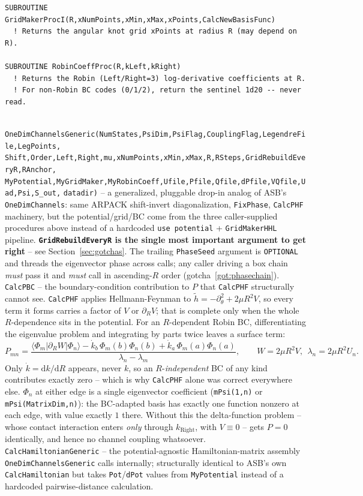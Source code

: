 \documentclass[11pt]{article}
\newcommand{\file}[1]{\texttt{#1}}
\newcommand{\sub}[1]{\texttt{#1}}
\begin{document}
\begin{description}
\begin{lstlisting}
SUBROUTINE GridMakerProcI(R,xNumPoints,xMin,xMax,xPoints,CalcNewBasisFunc)
  ! Returns the angular knot grid xPoints at radius R (may depend on R).

SUBROUTINE RobinCoeffProc(R,kLeft,kRight)
  ! Returns the Robin (Left/Right=3) log-derivative coefficients at R.
  ! For non-Robin BC codes (0/1/2), return the sentinel 1d20 -- never read.
\end{lstlisting}
\item[\file{AdiabaticSolverGeneric.f90}] \hfill \\
  \sub{OneDimChannelsGeneric(NumStates,PsiDim,PsiFlag,CouplingFlag,LegendreFile,LegPoints,}
  \sub{Shift,Order,Left,Right,mu,xNumPoints,xMin,xMax,R,RSteps,GridRebuildEveryR,RAnchor,}
  \sub{MyPotential,MyGridMaker,MyRobinCoeff,Ufile,Pfile,Qfile,dPfile,VQfile,Uad,Psi,S\_out,}
  \sub{datadir)} -- a generalized, pluggable drop-in analog of ASB's \sub{OneDimChannels}: same
  ARPACK shift-invert diagonalization, \sub{FixPhase}, \sub{CalcPHF} machinery, but the
  potential/grid/BC come from the three caller-supplied procedures above instead of a hardcoded
  \texttt{use potential} + \sub{GridMakerHHL} pipeline. \textbf{\texttt{GridRebuildEveryR} is the
  single most important argument to get right} -- see Section~\ref{sec:gotchas}. The trailing
  \texttt{PhaseSeed} argument is \texttt{OPTIONAL} and threads the eigenvector phase across calls;
  any caller driving a box chain \emph{must} pass it and \emph{must} call in ascending-$R$ order
  (gotcha~\ref{got:phasechain}).\\
  \sub{CalcPBC} -- the boundary-condition contribution to $P$ that \sub{CalcPHF} structurally
  cannot see. \sub{CalcPHF} applies Hellmann-Feynman to $\tilde h=-\partial_\theta^2+2\mu R^2V$, so
  every term it forms carries a factor of $V$ or $\partial_RV$; that is complete only when the whole
  $R$-dependence sits in the potential. For an $R$-dependent Robin BC, differentiating the
  eigenvalue problem and integrating by parts twice leaves a surface term:
  \[ P_{mn}=\frac{\langle\Phi_m|\partial_RW|\Phi_n\rangle-\dot k_b\,\Phi_m(b)\Phi_n(b)
     +\dot k_a\,\Phi_m(a)\Phi_n(a)}{\lambda_n-\lambda_m},\qquad W=2\mu R^2V,\ \
     \lambda_n=2\mu R^2U_n. \]
  Only $\dot k=\mathrm{d}k/\mathrm{d}R$ appears, never $k$, so an $R$-\emph{independent} BC of any
  kind contributes exactly zero -- which is why \sub{CalcPHF} alone was correct everywhere else.
  $\Phi_n$ at either edge is a single eigenvector coefficient (\texttt{mPsi(1,n)} or
  \texttt{mPsi(MatrixDim,n)}): the BC-adapted basis has exactly one function nonzero at each edge,
  with value exactly $1$ there. Without this the delta-function problem -- whose contact
  interaction enters \emph{only} through $k_{\mathrm{Right}}$, with $V\equiv0$ -- gets $P=0$
  identically, and hence no channel coupling whatsoever.\\
  \sub{CalcHamiltonianGeneric} -- the potential-agnostic Hamiltonian-matrix assembly
  \sub{OneDimChannelsGeneric} calls internally; structurally identical to ASB's own
  \sub{CalcHamiltonian} but takes \texttt{Pot}/\texttt{dPot} values from \sub{MyPotential} instead
  of a hardcoded pairwise-distance calculation.
\end{description}
\end{document}
